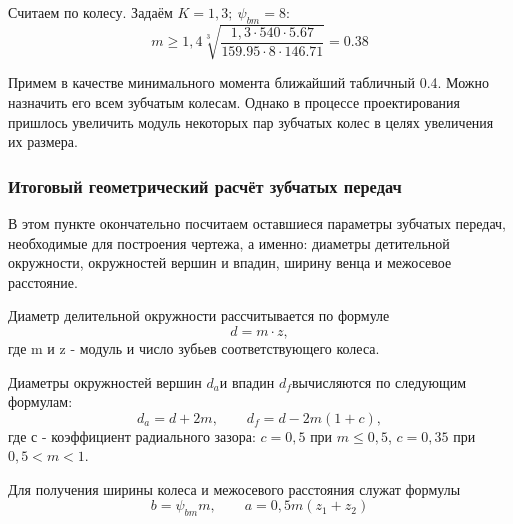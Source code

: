 \documentclass[14pt,a4paper,russian]{scrartcl}
\begin{document}
        Считаем по колесу. Задаём \( K=1,3;\ \psi_{bm}=8 \):
        \[ m \geq 1,4\sqrt[3]{\frac{1,3\cdot 540\cdot 5.67}{159.95\cdot 8\cdot 146.71}}=0.38 \]
        
        Примем в качестве минимального момента ближайший табличный 0.4. Можно назначить его
        всем зубчатым колесам. Однако в процессе проектирования пришлось увеличить модуль некоторых
        пар зубчатых колес в целях увеличения их размера.

    
    \subsubsection{Итоговый геометрический расчёт зубчатых передач}
        В этом пункте окончательно посчитаем оставшиеся параметры зубчатых передач,
        необходимые для построения чертежа, а именно: диаметры детительной окружности, окружностей вершин
        и впадин, ширину венца и межосевое расстояние.\par

        Диаметр делительной окружности рассчитывается по формуле
        \[ d = m\cdot z, \]
        где m и z - модуль и число зубьев соответствующего колеса.\par

        Диаметры окружностей вершин \( d_a \)и впадин \( d_f \)вычисляются по следующим формулам:
        \[ d_a = d + 2m,\qquad d_f = d - 2m(1+c),\]
        где с - коэффициент радиального зазора: 
            \( c=0,5 \) при \( m\leq 0,5 \), \( c=0,35 \) при \( 0,5<m<1 \).
        
        Для получения ширины колеса и межосевого расстояния служат формулы
        \[ b=\psi_{bm}m, \qquad  a = 0,5m(z_1+z_2)\]
        
\end{document}
